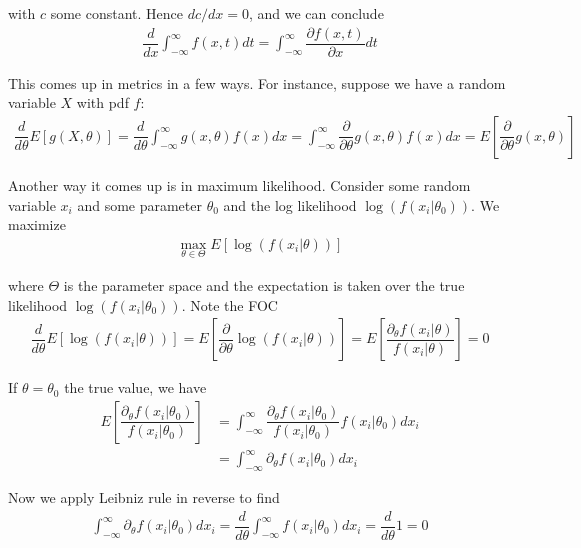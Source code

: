 \documentclass{article}
\begin{document}
\begin{enumerate}
\begin{remark}
    with $c$ some constant. Hence $dc/dx = 0$, and we can conclude
    \begin{align*}
      \dfrac{d}{dx} \int_{-\infty}^{\infty} f(x, t) dt
      =
      \int_{-\infty}^{\infty}
      \dfrac{\partial f(x, t)}{\partial x} dt
    \end{align*}

    This comes up in metrics in a few ways. For instance, suppose we have a random variable $X$ with pdf $f$:
    \begin{align*}
      \dfrac{d}{d\theta} E\left[g(X, \theta)\right]
      =
      \dfrac{d}{d\theta} \int_{-\infty}^{\infty} g(x, \theta) f(x) dx
      =
      \int_{-\infty}^{\infty} \dfrac{\partial}{\partial\theta} g(x, \theta) f(x) dx
      =
      E\left[
        \dfrac{\partial}{\partial\theta} g(x, \theta)
      \right]
    \end{align*}

    Another way it comes up is in maximum likelihood. Consider some random variable $x_i$ and some parameter $\theta_0$ and the log likelihood $\log(f(x_i | \theta_0))$. We maximize
    \begin{align*}
      \max_{\theta \in \Theta} E\left[\log(f(x_i | \theta))\right]
    \end{align*}

    where $\Theta$ is the parameter space and the expectation is taken over the true likelihood $\log(f(x_i | \theta_0))$. Note the FOC
    \begin{align*}
      \dfrac{d}{d\theta} E\left[\log(f(x_i | \theta))\right]
      =
      E\left[\dfrac{\partial}{\partial\theta} \log(f(x_i | \theta))\right]
      =
      E\left[\dfrac{\partial_{\theta} f(x_i | \theta)}{f(x_i | \theta)}\right]
      =
      0
    \end{align*}

    If $\theta = \theta_0$ the true value, we have
    \begin{align*}
      E\left[\dfrac{\partial_{\theta} f(x_i | \theta_0)}{f(x_i | \theta_0)}\right]
      &
      =
      \int_{-\infty}^{\infty}
      \dfrac{\partial_{\theta} f(x_i | \theta_0)}{f(x_i | \theta_0)}
      f(x_i | \theta_0)
      dx_i
      \\
      &
      =
      \int_{-\infty}^{\infty}
      \partial_{\theta} f(x_i | \theta_0)
      dx_i
    \end{align*}

    Now we apply Leibniz rule in reverse to find
    \begin{align*}
      \int_{-\infty}^{\infty}
      \partial_{\theta} f(x_i | \theta_0)
      dx_i
      =
      \dfrac{d}{d\theta}
      \int_{-\infty}^{\infty}
      f(x_i | \theta_0)
      dx_i
      =
      \dfrac{d}{d\theta} 1
      =
      0
    \end{align*}


\end{remark}
\end{enumerate}
\end{document}
